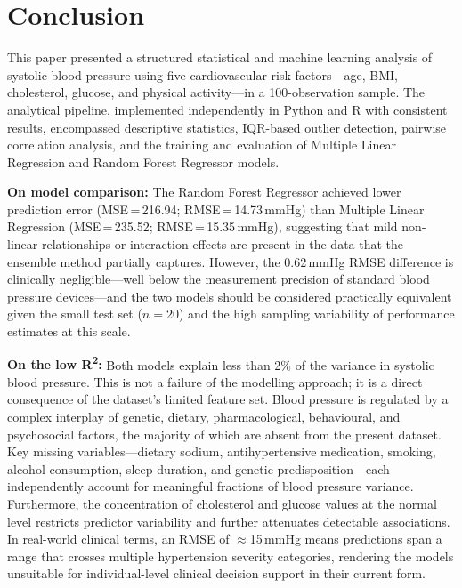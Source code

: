 ﻿\documentclass[conference]{IEEEtran}
\begin{document}
\section{Conclusion}
\label{sec:conclusion}

This paper presented a structured statistical and machine learning analysis of systolic blood pressure using five cardiovascular risk factors---age, BMI, cholesterol, glucose, and physical activity---in a 100-observation sample. The analytical pipeline, implemented independently in Python and R with consistent results, encompassed descriptive statistics, IQR-based outlier detection, pairwise correlation analysis, and the training and evaluation of Multiple Linear Regression and Random Forest Regressor models.

\textbf{On model comparison:} The Random Forest Regressor achieved lower prediction error (MSE\,=\,216.94; RMSE\,=\,14.73\,mmHg) than Multiple Linear Regression (MSE\,=\,235.52; RMSE\,=\,15.35\,mmHg), suggesting that mild non-linear relationships or interaction effects are present in the data that the ensemble method partially captures. However, the 0.62\,mmHg RMSE difference is clinically negligible---well below the measurement precision of standard blood pressure devices---and the two models should be considered practically equivalent given the small test set ($n=20$) and the high sampling variability of performance estimates at this scale.

\textbf{On the low R\textsuperscript{2}:} Both models explain less than 2\% of the variance in systolic blood pressure. This is not a failure of the modelling approach; it is a direct consequence of the dataset's limited feature set. Blood pressure is regulated by a complex interplay of genetic, dietary, pharmacological, behavioural, and psychosocial factors, the majority of which are absent from the present dataset. Key missing variables---dietary sodium, antihypertensive medication, smoking, alcohol consumption, sleep duration, and genetic predisposition---each independently account for meaningful fractions of blood pressure variance. Furthermore, the concentration of cholesterol and glucose values at the normal level restricts predictor variability and further attenuates detectable associations. In real-world clinical terms, an RMSE of $\approx$15\,mmHg means predictions span a range that crosses multiple hypertension severity categories, rendering the models unsuitable for individual-level clinical decision support in their current form.
\end{document}
